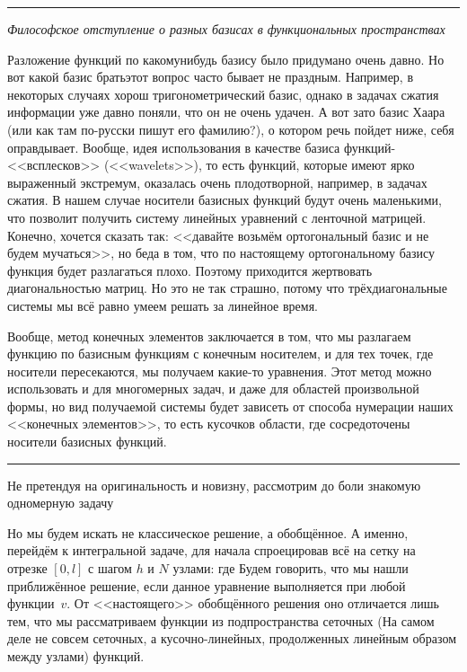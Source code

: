 \documentclass[a4paper]{article}
\newcommand{\dx}{\,dx}
\newenvironment{petit}{\medskip\hrule\smallskip\footnotesize}{\par\smallskip\hrule\medskip}
\begin{document}
\begin{petit}

\textsl{Философское отступление о разных базисах в функциональных пространствах}

Разложение функций по какому\д нибудь базису было придумано очень давно. Но вот какой базис брать\т этот вопрос
часто бывает не праздным. Например, в некоторых случаях хорош тригонометрический базис, однако в задачах сжатия
информации уже давно поняли, что он не очень удачен. А вот зато базис Хаара (или как там по-русски пишут его фамилию?),
о котором речь пойдет ниже, себя оправдывает. Вообще, идея использования в качестве базиса функций-<<всплесков>> (<<wavelets>>),
то есть функций, которые имеют ярко выраженный экстремум, оказалась очень плодотворной, например, в задачах сжатия.
В нашем случае носители базисных функций будут очень маленькими, что позволит получить систему линейных уравнений с ленточной
матрицей. Конечно, хочется сказать так: <<давайте возьмём ортогональный базис и не будем мучаться>>, но беда в том, что по настоящему
ортогональному базису функция будет разлагаться плохо. Поэтому приходится жертвовать диагональностью матриц. Но это не так страшно,
потому что трёхдиагональные системы мы всё равно умеем решать за линейное время.

Вообще, метод конечных элементов заключается в том, что мы разлагаем функцию по базисным функциям с конечным носителем, и для тех точек,
где носители пересекаются, мы получаем какие-то уравнения. Этот метод можно использовать и для многомерных задач, и даже для областей
произвольной формы, но вид получаемой системы будет зависеть от способа нумерации наших <<конечных элементов>>, то есть кусочков области,
где сосредоточены носители базисных функций.
\end{petit}


Не претендуя на оригинальность и новизну, рассмотрим до боли знакомую одномерную задачу

Но мы будем искать не классическое решение, а обобщённое. А именно, перейдём к интегральной задаче, для начала спроецировав всё на сетку
на отрезке $[0,l]$ с шагом $h$ и $N$ узлами:
\eqn{a(u,v):=\intl{0}{l}(u'v'+puv)\dx + \al u(0) v(0) = (f,v),}
где
Будем говорить, что мы нашли приближённое решение, если данное уравнение выполняется при любой функции~$v$.
От <<настоящего>> обобщённого решения оно отличается лишь тем, что мы рассматриваем функции из подпространства
сеточных (На самом деле не совсем сеточных, а кусочно-линейных, продолженных линейным образом между узлами) функций.
\end{document}
